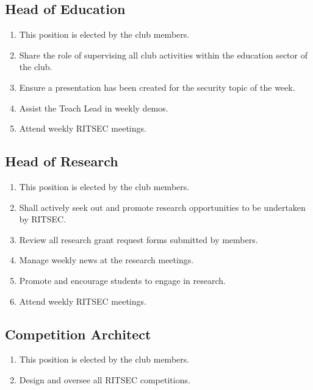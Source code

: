 \documentclass{article}
\begin{document}
\subsection{Head of Education}

\begin{enumerate}
  \item This position is elected by the club members.
  \item Share the role of supervising all club activities within the education
    sector of the club.
  \item Ensure a presentation has been created for the security topic of the
    week.
  \item Assist the Teach Lead in weekly demos.
  \item Attend weekly RITSEC meetings.
\end{enumerate}

\subsection{Head of Research}

\begin{enumerate}
  \item This position is elected by the club members.
  \item Shall actively seek out and promote research opportunities to be
    undertaken by RITSEC.
  \item Review all research grant request forms submitted by members. 
  \item Manage weekly news at the research meetings.
  \item Promote and encourage students to engage in research.
  \item Attend weekly RITSEC meetings.
\end{enumerate}

\subsection{Competition Architect}

\begin{enumerate}
  \item This position is elected by the club members.
  \item Design and oversee all RITSEC competitions.
\end{enumerate}

\end{document}
